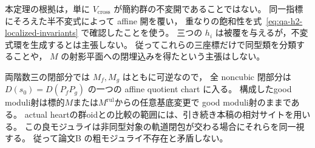 \begin{remark}[線形化の役割と三式の限界]
本定理の根拠は，単に $V_{\mathrm{cross}}$ が簡約群の不変開であることではない。
同一指標にそろえた半不変式によって affine 開を覆い，
重なりの飽和性を式~\eqref{eq:qa-h2-localized-invariants} で確認したことを使う。
三つの $h_i$ は被覆を与えるが，不変式環を生成するとは主張しない。
従ってこれらの三座標だけで同型類を分類することや，
$M$ の射影平面への閉埋込みを得たという主張はしない。

両階数三の閉部分では $M_f,M_g$ はともに可逆なので，
全 noncubic 閉部分は $D(s_0)=D(P_fP_g)$ の一つの affine quotient chart に入る。
構成したgood moduli射は標的$M$または$M^{\mathrm{rul}}$からの任意基底変更で
good moduli射のままである\cite[Proposition 4.7]{AlperGoodModuli2013}。
actual heartの群oidとの比較の範囲には、引き続き本稿の相対サイトを用いる。
この良モジュライは非同型対象の軌道閉包が交わる場合にそれらを同一視する。
従って論文B\cite[\texttt{cor:global-h2-no-coarse-space}]{QuadricModuli2026}
の粗モジュライ不存在と矛盾しない。
\end{remark}
